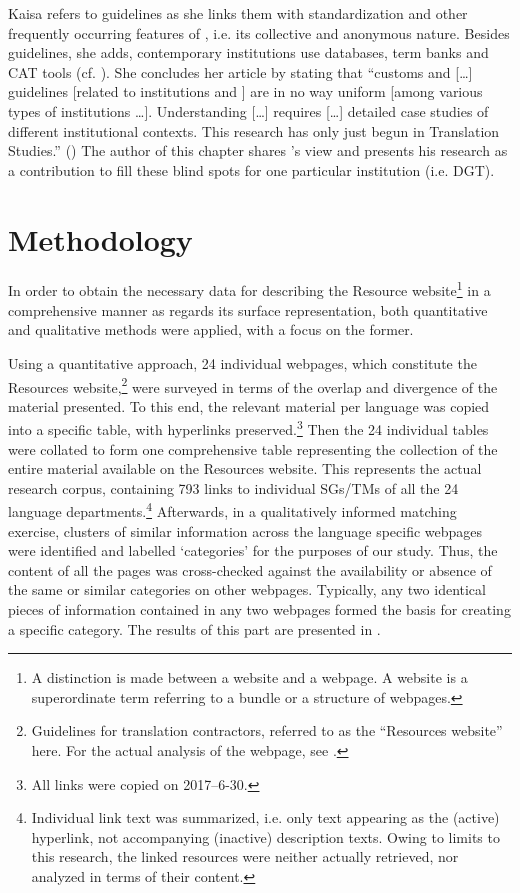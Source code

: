 \documentclass[output=paper]{langsci/langscibook}
\begin{document}
\largerpage
Kaisa \citet{Koskinen2011} refers to guidelines as she links them with standardization and other frequently occurring features of , i.e. its collective and anonymous nature. Besides guidelines, she adds, contemporary institutions use databases, term banks and CAT tools (cf. \citealt[58]{Koskinen2011}). She concludes her article by stating that “customs and […] guidelines [related to institutions and ] are in no way uniform [among various types of institutions …]. Understanding  […] requires […] detailed case studies of different institutional contexts. This research has only just begun in Translation Studies.” (\citealt[59]{Koskinen2011}) The author of this chapter shares \citeauthor{Koskinen2011}’s view and presents his research as a contribution to fill these blind spots for one particular institution (i.e. DGT).

\section{Methodology}\label{sec:svoboda:methodology}

In order to obtain the necessary data for describing the  Resource website\footnote{A distinction is made between a website and a webpage. A website is a superordinate term referring to a bundle or a structure of webpages.} in a comprehensive manner as regards its surface representation, both quantitative and qualitative methods were applied, with a focus on the former.

Using a quantitative approach, 24 individual webpages, which constitute the  Resources website,\footnote{Guidelines for translation contractors, referred to as the “Resources website” here. For the actual analysis of the webpage, see .} were surveyed in terms of the overlap and divergence of the material presented. To this end, the relevant material per language was copied into a specific table, with hyperlinks preserved.\footnote{All links were copied on 2017–6-30.}  Then the 24 individual tables were collated to form one comprehensive table representing the collection of the entire material available on the Resources website. This represents the actual research corpus, containing 793 links to individual SGs/TMs of all the 24 language departments.\footnote{Individual link text was summarized, i.e. only text appearing as the (active) hyperlink, not accompanying (inactive) description texts. Owing to limits to this research, the linked resources were neither actually retrieved, nor analyzed in terms of their content.}
Afterwards, in a qualitatively informed matching exercise, clusters of similar information across the language specific webpages were identified and labelled ‘categories’ for the purposes of our study. Thus, the content of all the pages was cross-checked against the availability or absence of the same or similar categories on other webpages. Typically, any two identical pieces of information contained in any two webpages formed the basis for creating a specific category. The results of this part are presented in .
\end{document}
